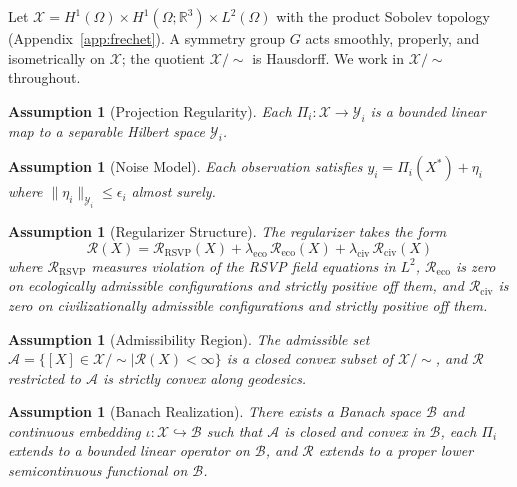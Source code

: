 \documentclass[11pt, oneside]{article}
\newtheorem{assumption}[theorem]{Assumption}
\newcommand{\Xmod}{\mathcal{X}/{\sim}}
\begin{document}
Let $\mathcal{X} = H^1(\Omega) \times H^1(\Omega;\mathbb{R}^3) \times L^2(\Omega)$
with the product Sobolev topology (Appendix~\ref{app:frechet}). A symmetry group $G$
acts smoothly, properly, and isometrically on $\mathcal{X}$; the quotient $\Xmod$ is
Hausdorff. We work in $\Xmod$ throughout.

\begin{assumption}[Projection Regularity]
\label{ass:regularity}
Each $\Pi_i : \mathcal{X} \to \mathcal{Y}_i$ is a bounded linear map to a separable
Hilbert space $\mathcal{Y}_i$.
\end{assumption}

\begin{assumption}[Noise Model]
\label{ass:noise}
Each observation satisfies $y_i = \Pi_i(X^*) + \eta_i$ where $\|\eta_i\|_{\mathcal{Y}_i}
\le \epsilon_i$ almost surely.
\end{assumption}

\begin{assumption}[Regularizer Structure]
\label{ass:regularizer}
The regularizer takes the form
\[
\mathcal{R}(X) = \mathcal{R}_{\mathrm{RSVP}}(X)
+ \lambda_{\mathrm{eco}}\,\mathcal{R}_{\mathrm{eco}}(X)
+ \lambda_{\mathrm{civ}}\,\mathcal{R}_{\mathrm{civ}}(X)
\]
where $\mathcal{R}_{\mathrm{RSVP}}$ measures violation of the RSVP field equations in
$L^2$, $\mathcal{R}_{\mathrm{eco}}$ is zero on ecologically admissible configurations
and strictly positive off them, and $\mathcal{R}_{\mathrm{civ}}$ is zero on
civilizationally admissible configurations and strictly positive off them.
\end{assumption}

\begin{assumption}[Admissibility Region]
\label{ass:admissibility}
The admissible set $\mathcal{A} = \{[X] \in \Xmod \mid \mathcal{R}(X) < \infty\}$
is a closed convex subset of $\Xmod$, and $\mathcal{R}$ restricted to $\mathcal{A}$
is strictly convex along geodesics.
\end{assumption}

\begin{assumption}[Banach Realization]
\label{ass:banach}
There exists a Banach space $\mathcal{B}$ and continuous embedding
$\iota : \mathcal{X} \hookrightarrow \mathcal{B}$ such that $\mathcal{A}$ is closed and
convex in $\mathcal{B}$, each $\Pi_i$ extends to a bounded linear operator on
$\mathcal{B}$, and $\mathcal{R}$ extends to a proper lower semicontinuous functional on
$\mathcal{B}$.
\end{assumption}
\end{document}
